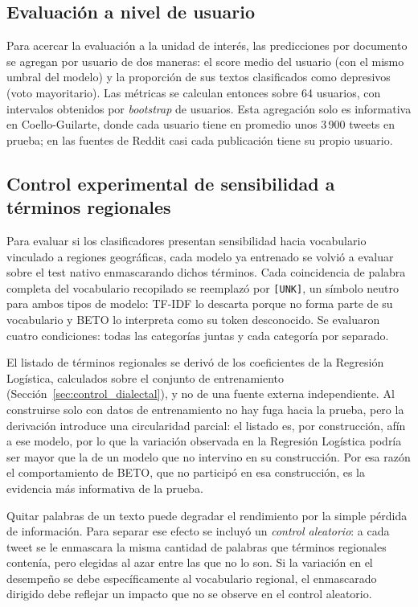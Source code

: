 \documentclass[12pt,a4paper]{article}
\begin{document}
\subsection{Evaluación a nivel de usuario}
\label{sec:met_usuario}
Para acercar la evaluación a la unidad de interés, las predicciones por documento se agregan por usuario de dos maneras: el score medio del usuario (con el mismo umbral del modelo) y la proporción de sus textos clasificados como depresivos (voto mayoritario). Las métricas se calculan entonces sobre 64 usuarios, con intervalos obtenidos por \emph{bootstrap} de usuarios. Esta agregación solo es informativa en Coello-Guilarte, donde cada usuario tiene en promedio unos 3\,900 tweets en prueba; en las fuentes de Reddit casi cada publicación tiene su propio usuario.

\subsection{Control experimental de sensibilidad a términos regionales}
\label{sec:met_dialecto}
Para evaluar si los clasificadores presentan sensibilidad hacia vocabulario vinculado a regiones geográficas, cada modelo ya entrenado se volvió a evaluar sobre el test nativo enmascarando dichos términos. Cada coincidencia de palabra completa del vocabulario recopilado se reemplazó por \texttt{[UNK]}, un símbolo neutro para ambos tipos de modelo: TF-IDF lo descarta porque no forma parte de su vocabulario y BETO lo interpreta como su token desconocido. Se evaluaron cuatro condiciones: todas las categorías juntas y cada categoría por separado.

El listado de términos regionales se derivó de los coeficientes de la Regresión Logística, calculados sobre el conjunto de entrenamiento (Sección~\ref{sec:control_dialectal}), y no de una fuente externa independiente. Al construirse solo con datos de entrenamiento no hay fuga hacia la prueba, pero la derivación introduce una circularidad parcial: el listado es, por construcción, afín a ese modelo, por lo que la variación observada en la Regresión Logística podría ser mayor que la de un modelo que no intervino en su construcción. Por esa razón el comportamiento de BETO, que no participó en esa construcción, es la evidencia más informativa de la prueba.

Quitar palabras de un texto puede degradar el rendimiento por la simple pérdida de información. Para separar ese efecto se incluyó un \emph{control aleatorio}: a cada tweet se le enmascara la misma cantidad de palabras que términos regionales contenía, pero elegidas al azar entre las que no lo son. Si la variación en el desempeño se debe específicamente al vocabulario regional, el enmascarado dirigido debe reflejar un impacto que no se observe en el control aleatorio.
\end{document}
